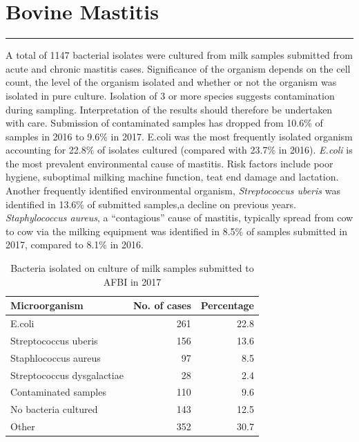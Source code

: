 \documentclass[]{book}
\begin{document}
\chapter{Bovine Mastitis}\label{bovine-mastitis}

\begin{center}\rule{0.5\linewidth}{\linethickness}\end{center}

A total of 1147 bacterial isolates were cultured from milk samples
submitted from acute and chronic mastitis cases. Significance of the
organism depends on the cell count, the level of the organism isolated
and whether or not the organism was isolated in pure culture. Isolation
of 3 or more species suggests contamination during sampling.
Interpretation of the results should therefore be undertaken with care.
Submission of contaminated samples has dropped from 10.6\% of samples in
2016 to 9.6\% in 2017. E.coli was the most frequently isolated organism
accounting for 22.8\% of isolates cultured (compared with 23.7\% in
2016). \emph{E.coli} is the most prevalent environmental cause of
mastitis. Risk factors include poor hygiene, suboptimal milking machine
function, teat end damage and lactation. Another frequently identified
environmental organism, \emph{Streptococcus uberis} was identified in
13.6\% of submitted samples,a decline on previous years.
\emph{Staphylococcus aureus}, a ``contagious'' cause of mastitis,
typically spread from cow to cow via the milking equipment was
identified in 8.5\% of samples submitted in 2017, compared to 8.1\% in
2016.

\begin{table}

\caption{\label{tab:unnamed-chunk-48}Bacteria isolated on culture of milk samples submitted to AFBI in 2017}
\centering
\begin{tabular}[t]{l|r|r}
\hline
Microorganism & No. of cases & Percentage\\
\hline
E.coli & 261 & 22.8\\
\hline
Streptococcus uberis & 156 & 13.6\\
\hline
Staphlococcus aureus & 97 & 8.5\\
\hline
Streptococcus dysgalactiae & 28 & 2.4\\
\hline
Contaminated samples & 110 & 9.6\\
\hline
No bacteria cultured & 143 & 12.5\\
\hline
Other & 352 & 30.7\\
\hline
\end{tabular}
\end{table}
\end{document}
